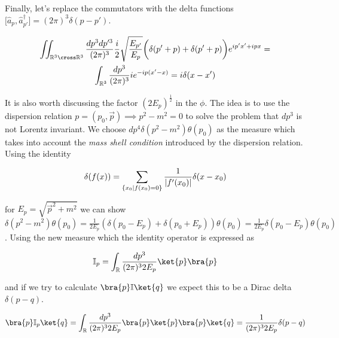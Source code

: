 Finally, let's replace the commutators with the delta functions $\big[\hat{a}_{p}, \hat{a}^{\dagger}_{p'} \big] = (2 \pi)^{3} \delta(p - p')$.

\begin{equation*}
    \begin{gathered}
        \iint_{\mathbb{R}^{3} \cross \mathbb{R}^{3}} \frac{dp^{3} dp'^{3}}{(2 \pi)^{3}} \frac{i}{2} \sqrt{\frac{E_{p'}}{E_{p}}}
        \bigg( \delta(p' + p) + \delta(p' + p) \bigg) e^{i p' x' + i p x} = \\
        \int_{\mathbb{R}^{3}} \frac{dp^{3}}{(2 \pi)^{3}} i e^{- i p(x' - x)} = i \delta(x - x') \\
    \end{gathered}
\end{equation*}

It is also worth discussing the factor $(2 E_{p})^{\frac{1}{2}}$ in the $\phi$. The idea is
to use the dispersion relation $p = (p_{0}, \vec{p}) \implies p^{2} - m^2 = 0$ to solve the problem that $dp^{3}$ is
not Lorentz invariant. We choose $dp^{4} \delta(p^{2} - m^2) \theta(p_{0})$ as the measure which takes into account 
the \textit{mass shell condition} introduced by the dispersion relation. Using the identity

\begin{equation*}
    \delta(f(x)) = \sum_{\{x_{0} \\ | \\ f(x_{0}) = 0\}} \frac{1}{|f'(x_{0})|} \delta(x - x_{0})
\end{equation*}

for $E_{p} = \sqrt{\vec{p}^{2} + m^{2}}$ we can show $\delta(p^{2} - m^2) \theta(p_{0}) = \frac{1}{2 E_{p}} (\delta(p_{0} - E_{p}) + 
\delta(p_{0} + E_{p})) \theta(p_{0}) = \frac{1}{2 E_{p}} \delta(p_{0} - E_{p}) \theta(p_{0})$. Using the new measure which
the identity operator is expressed as 

\begin{equation*}
    \mathbb{I}_{p} = \int_{\mathbb{R}} \frac{dp^{3}}{(2 \pi)^{3} 2 E_{p}} \ket{p} \bra{p}
\end{equation*}

and if we try to calculate $\bra{p} \mathbb{I} \ket{q}$ we expect this to be a Dirac delta $\delta(p - q)$.

\begin{equation*}
    \bra{p} \mathbb{I}_{p} \ket{q} = \int_{\mathbb{R}} \frac{dp^{3}}{(2 \pi)^{3} 2 E_{p}} \bra{p} \ket{p} \bra{p}\ket{q} = \frac{1}{(2 \pi)^{3} 2 E_{p}} \delta(p - q)
\end{equation*}

